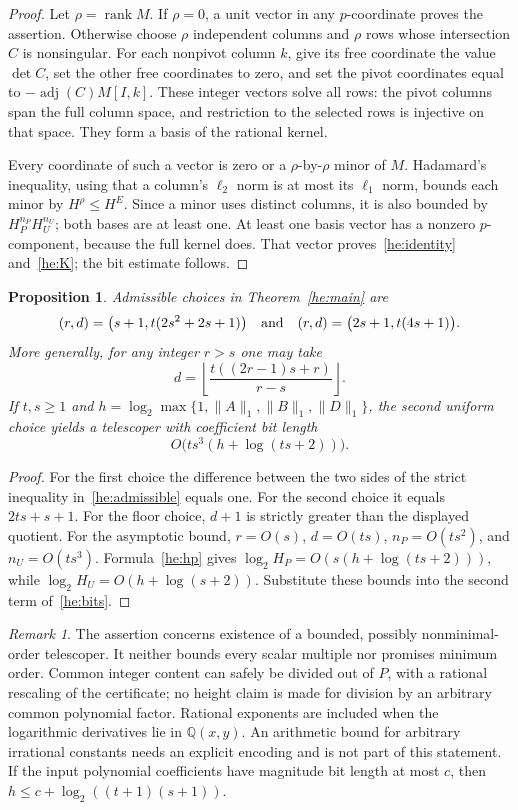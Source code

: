 \documentclass[11pt,a4paper]{article}
\newtheorem{proposition}[theorem]{Proposition}
\theoremstyle{remark}\newtheorem{remark}[theorem]{Remark}
\begin{document}
\begin{proof}
Let $\rho=\operatorname{rank}M$. If $\rho=0$, a unit vector in any
$p$-coordinate proves the assertion. Otherwise choose $\rho$ independent
columns and $\rho$ rows whose intersection $C$ is nonsingular. For each
nonpivot column $k$, give its free coordinate the value $\det C$, set
the other free coordinates to zero, and set the pivot coordinates equal
to $-\operatorname{adj}(C)M[I,k]$. These integer vectors solve all rows:
the pivot columns span the full column space, and restriction to the
selected rows is injective on that space. They form a basis of the
rational kernel.

Every coordinate of such a vector is zero or a $\rho$-by-$\rho$ minor
of $M$. Hadamard's inequality, using that a column's $\ell_2$ norm is at
most its $\ell_1$ norm, bounds each minor by $H^\rho\le H^E$.
Since a minor uses distinct columns, it is also bounded by
$H_P^{n_P}H_U^{n_U}$; both bases are at least one. At least one basis
vector has a nonzero $p$-component, because the full kernel does. That
vector proves~\eqref{he:identity} and~\eqref{he:K};
the bit estimate follows.
\end{proof}

\begin{proposition}\label{he:explicit}
Admissible choices in Theorem~\ref{he:main} are
\[
 (r,d)=\bigl(s+1,t(2s^2+2s+1)\bigr)
 \quad\hbox{and}\quad
 (r,d)=\bigl(2s+1,t(4s+1)\bigr).
\]
More generally, for any integer $r>s$ one may take
\[
 d=\left\lfloor\frac{t((2r-1)s+r)}{r-s}\right\rfloor.
\]
If $t,s\ge1$ and
$h=\log_2\max\{1,\|A\|_1,\|B\|_1,\|D\|_1\}$, the second uniform
choice yields a telescoper with coefficient bit length
\[
 O\bigl(ts^3(h+\log(ts+2))\bigr).
\]
\end{proposition}
\begin{proof}
For the first choice the difference between the two sides of the strict
inequality in~\eqref{he:admissible} equals one. For the second choice it
equals $2ts+s+1$. For the floor choice, $d+1$ is strictly greater than
the displayed quotient.
For the asymptotic bound, $r=O(s)$, $d=O(ts)$,
$n_P=O(ts^2)$, and $n_U=O(ts^3)$. Formula~\eqref{he:hp} gives
$\log_2H_P=O(s(h+\log(ts+2)))$, while
$\log_2H_U=O(h+\log(s+2))$. Substitute these bounds into the second
term of~\eqref{he:bits}.
\end{proof}

\begin{remark}\label{he:scope}
The assertion concerns existence of a bounded, possibly nonminimal-order
telescoper. It neither bounds every scalar multiple nor promises minimum
order. Common integer content can safely be divided out of $P$, with a
rational rescaling of the certificate; no height claim is made for
division by an arbitrary common polynomial factor. Rational exponents
are included when the logarithmic derivatives lie in $\mathbb Q(x,y)$.
An arithmetic bound for arbitrary irrational constants needs an explicit
encoding and is not part of this statement. If the input polynomial
coefficients have magnitude bit length at most $c$, then
$h\le c+\log_2((t+1)(s+1))$.
\end{remark}
\end{document}
